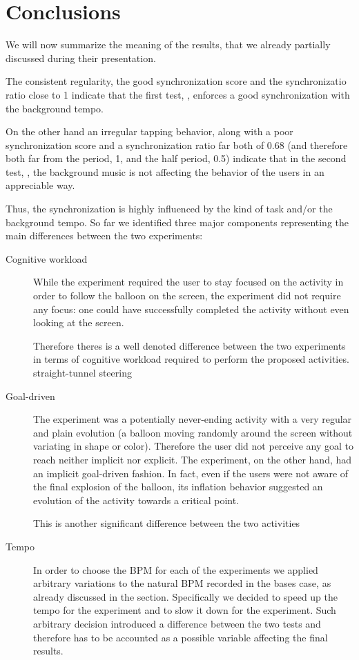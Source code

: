 \section{Conclusions}\label{sec:conclusions}
We will now summarize the meaning of the results, that we already partially discussed during their presentation.

The consistent regularity, the good synchronization score and the synchronizatio ratio close to 1 indicate that the first test, \testfirst, enforces a good synchronization with the background tempo.

On the other hand an irregular tapping behavior, along with a poor synchronization score and a synchronization ratio far both of 0.68 (and therefore both far from the period, 1, and the half period, 0.5) indicate that in the second test, \testsecond, the background music is not affecting the behavior of the users in an appreciable way.

Thus, the synchronization is highly influenced by the kind of task and/or the background tempo. So far we identified three major components representing the main differences between the two experiments:

\begin{description}
	\item[Cognitive workload] While the \testfirst experiment required the user to stay focused on the activity in order to follow the balloon on the screen, the \testsecond experiment did not require any focus: one could have successfully completed the activity without even looking at the screen.

	Therefore theres is a well denoted difference between the two experiments in terms of cognitive workload required to perform the proposed activities.
straight-tunnel steering
	\item[Goal-driven] The \testfirst experiment was a potentially never-ending activity with a very regular and plain evolution (a balloon moving randomly around the screen without variating in shape or color). Therefore the user did not perceive any goal to reach neither implicit nor explicit. The \testsecond experiment, on the other hand, had an implicit goal-driven fashion. In fact, even if the users were not aware of the final explosion of the balloon, its inflation behavior suggested an evolution of the activity towards a critical point.

	This is another significant difference between the two activities

	\item[Tempo] In order to choose the BPM for each of the experiments we applied arbitrary variations to the natural BPM recorded in the bases case, as already discussed in the  section. Specifically we decided to speed up the tempo for the \testfirst experiment and to slow it down for the \testsecond experiment.
	Such arbitrary decision introduced a difference between the two tests and therefore has to be accounted as a possible variable affecting the final results. 
\end{description}

